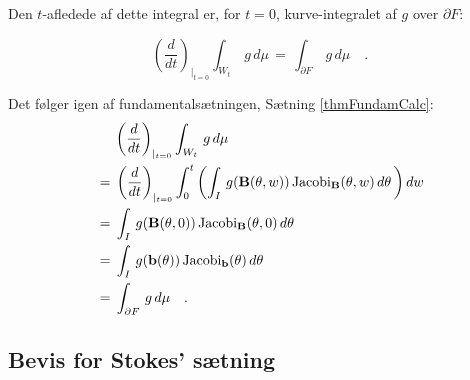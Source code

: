 Den $t$-afledede af dette integral er, for $t=0$,
kurve-integralet af $g$ over $\partial F$:

\begin{lemma} \label{lemKurveFraFlade}
\begin{equation}\label{eqFatWallTderiv}
\left(\frac{d}{dt}\right)_{|_{t=0}}\int_{W_{t}}\,
g\,d\mu \, = \,
 \int_{\partial F}\,g \, d\mu \quad .
\end{equation}
\end{lemma}

\begin{bevis}
Det følger igen af fundamentalsætningen, Sætning
\ref{thmFundamCalc}:
\begin{equation}
\begin{aligned}
&\phantom{= \,\,\,}\left(\frac{d}{dt}\right)_{|_{t=0}}\int_{W_{t}}\, g\,d\mu\, \\
&= \,
\left(\frac{d}{dt}\right)_{|_{t=0}}\int_{0}^{t}\left(\int_{I}\, g({\bf{B}}(\theta,w)) \operatorname{Jacobi}_{{\bf{B}}}(\theta,w)\,d\theta\,\right)dw \\
&= \, \int_{I}\, g({\bf{B}}(\theta,0)) \operatorname{Jacobi}_{{\bf{B}}}(\theta,0)\,d\theta \\
&= \, \int_{I} \,g({\bf{b}}(\theta)) \operatorname{Jacobi}_{{\bf{b}}}(\theta)\,d\theta \\
&= \,
 \int_{\partial F}\,g \, d\mu \quad .
\end{aligned}
\end{equation}
\end{bevis}

\subsection{Bevis for Stokes' sætning} \label{secStokesSurf}

